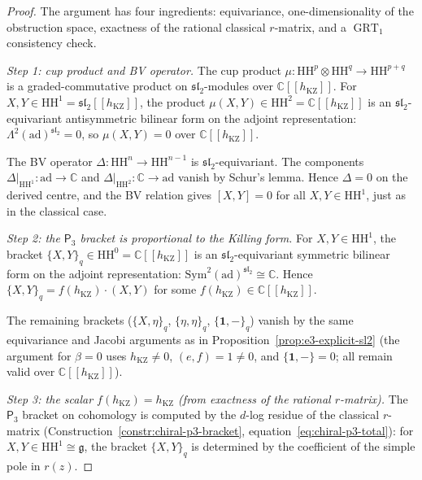 \documentclass[11pt,reqno]{amsart}
\theoremstyle{definition}
\theoremstyle{remark}
\newcommand{\HH}{\mathrm{HH}}
\newcommand{\Pthree}{\mathsf{P}_{3}}
\newcommand{\Sym}{\mathrm{Sym}}
\DeclareMathOperator{\GRT}{GRT}
\newcommand{\fg}{\mathfrak{g}}
\newcommand{\CC}{\mathbb{C}}
\numberwithin{equation}{section}
\begin{document}
\begin{proof}
The argument has four ingredients: equivariance,
one-dimensionality of the obstruction space,
exactness of the rational classical $r$-matrix, and a
$\GRT_1$ consistency check.

\textit{Step 1: cup product and BV operator.}
The cup product $\mu \colon \HH^p \otimes \HH^q
\to \HH^{p+q}$ is a graded-commutative product on
$\mathfrak{sl}_2$-modules over $\CC[[h_{\mathrm{KZ}}]]$.
For $X, Y \in \HH^1
= \mathfrak{sl}_2[[h_{\mathrm{KZ}}]]$,
the product $\mu(X, Y) \in \HH^2
= \CC[[h_{\mathrm{KZ}}]]$
is an $\mathfrak{sl}_2$-equivariant antisymmetric
bilinear form on the adjoint representation:
$\Lambda^2(\mathrm{ad})^{\mathfrak{sl}_2} = 0$,
so $\mu(X, Y) = 0$ over $\CC[[h_{\mathrm{KZ}}]]$.

The BV operator $\Delta \colon \HH^n \to \HH^{n-1}$
is $\mathfrak{sl}_2$-equivariant. The components
$\Delta|_{\HH^1} \colon \mathrm{ad} \to \CC$ and
$\Delta|_{\HH^2} \colon \CC \to \mathrm{ad}$ vanish
by Schur's lemma. Hence $\Delta = 0$ on the derived
centre, and the BV relation gives
$[X, Y] = 0$ for all $X, Y \in \HH^1$, just as in the
classical case.

\textit{Step 2: the $\Pthree$ bracket is proportional
to the Killing form.}
For $X, Y \in \HH^1$, the bracket
$\{X, Y\}_q \in \HH^0 = \CC[[h_{\mathrm{KZ}}]]$ is an
$\mathfrak{sl}_2$-equivariant symmetric bilinear
form on the adjoint representation:
$\Sym^2(\mathrm{ad})^{\mathfrak{sl}_2} \cong \CC$.
Hence $\{X, Y\}_q = f(h_{\mathrm{KZ}}) \cdot (X, Y)$
for some
$f(h_{\mathrm{KZ}}) \in \CC[[h_{\mathrm{KZ}}]]$.

The remaining brackets ($\{X, \eta\}_q$,
$\{\eta, \eta\}_q$, $\{\mathbf{1}, -\}_q$)
vanish by the same equivariance and Jacobi arguments
as in Proposition~\ref{prop:e3-explicit-sl2}
(the argument for $\beta = 0$ uses
$h_{\mathrm{KZ}} \neq 0$, $(e,f) = 1 \neq 0$, and
$\{\mathbf{1}, -\} = 0$; all remain valid over
$\CC[[h_{\mathrm{KZ}}]]$).

\textit{Step 3: the scalar
$f(h_{\mathrm{KZ}}) = h_{\mathrm{KZ}}$
\textup{(}from exactness of the rational
$r$-matrix\textup{)}.}
The $\Pthree$ bracket on cohomology is computed by
the $d$-log residue of the classical $r$-matrix
(Construction~\ref{constr:chiral-p3-bracket},
equation~\eqref{eq:chiral-p3-total}): for
$X, Y \in \HH^1 \cong \fg$, the bracket
$\{X, Y\}_q$ is determined by the coefficient of
the simple pole in $r(z)$.


\end{proof}
\end{document}
